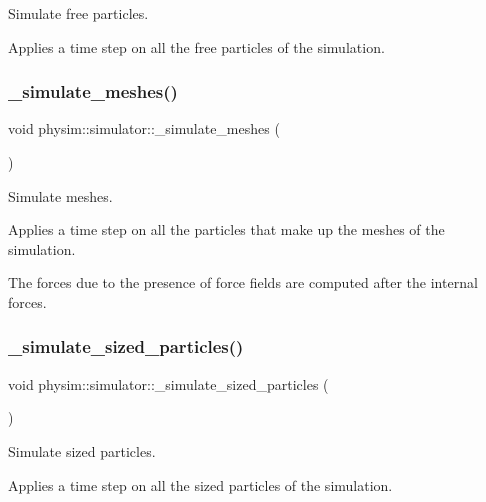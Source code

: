 Simulate free particles. 

Applies a time step on all the free particles of the simulation. \mbox{\label{classphysim_1_1simulator_ac598aa9b36e01c8cee937a8f95719cd8}} 
\subsubsection{\texorpdfstring{\+\_\+simulate\+\_\+meshes()}{\_simulate\_meshes()}}
{\footnotesize\ttfamily void physim\+::simulator\+::\+\_\+simulate\+\_\+meshes (\begin{DoxyParamCaption}{ }\end{DoxyParamCaption})\hspace{0.3cm}{\ttfamily [private]}}



Simulate meshes. 

Applies a time step on all the particles that make up the meshes of the simulation.

The forces due to the presence of force fields are computed after the internal forces. \mbox{\label{classphysim_1_1simulator_a04922992cda3b1c402da7041324c6049}} 
\subsubsection{\texorpdfstring{\+\_\+simulate\+\_\+sized\+\_\+particles()}{\_simulate\_sized\_particles()}}
{\footnotesize\ttfamily void physim\+::simulator\+::\+\_\+simulate\+\_\+sized\+\_\+particles (\begin{DoxyParamCaption}{ }\end{DoxyParamCaption})\hspace{0.3cm}{\ttfamily [private]}}



Simulate sized particles. 

Applies a time step on all the sized particles of the simulation. \mbox{\label{classphysim_1_1simulator_ae8d53411a8f972962e60e46980b7766d}} 
